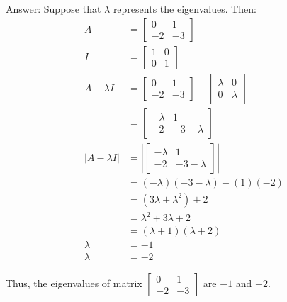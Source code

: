 \documentclass[12pt]{article}
\begin{document}
\color{blue}
Answer: Suppose that $\lambda$ represents the eigenvalues. Then:
\begin{align*}
    A &= 
    \begin{bmatrix}
        0 & 1 \\
        -2 & -3
    \end{bmatrix} \\
    I &=
    \begin{bmatrix}
        1 & 0 \\
        0 & 1
    \end{bmatrix} \\
    A - \lambda I &=
    \begin{bmatrix}
        0 & 1 \\
        -2 & -3
    \end{bmatrix}
    -
    \begin{bmatrix}
        \lambda & 0 \\
        0 & \lambda
    \end{bmatrix} \\
    &=
    \begin{bmatrix}
        - \lambda & 1 \\
        -2 & -3 - \lambda
    \end{bmatrix} \\
    |A - \lambda I| &= |
    \begin{bmatrix}
        - \lambda & 1 \\
        -2 & -3 - \lambda
    \end{bmatrix}
    | \\
    &= (- \lambda)(-3 - \lambda) - (1)(-2) \\
    &= (3 \lambda + \lambda^2) + 2 \\
    &= \lambda^2 + 3 \lambda + 2 \\
    &= (\lambda + 1) (\lambda + 2) \\
    \lambda &= -1 \\
    \lambda &= -2
\end{align*}

Thus, the eigenvalues of matrix
$\begin{bmatrix}
    0 & 1 \\
    -2 & -3
\end{bmatrix}$
are $-1$ and $-2$.

\color{black}
\end{document}
